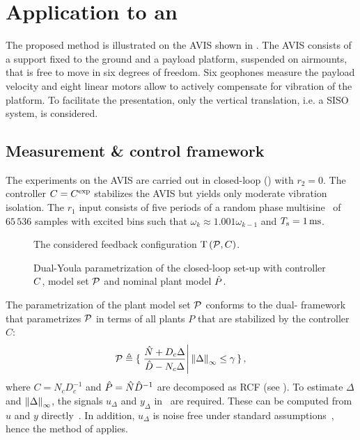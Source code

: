 \section{Application to an }
\label{sec:measurement}
The proposed method is illustrated on the \gls{AVIS} shown in .
The \gls{AVIS} consists of a support fixed to the ground and a payload platform, suspended on airmounts, that is free to move in six degrees of freedom.
Six geophones measure the payload velocity and eight linear motors allow to actively compensate for vibration of the platform.
To facilitate the presentation, only the vertical translation, i.e. a \gls{SISO} system,  is considered.

\subsection{Measurement \& control framework}
\label{sec:control}
The experiments on the \gls{AVIS} are carried out in closed-loop () with $r_2 = 0$.
The controller $\Controller=\experimental\Controller$  stabilizes the \gls{AVIS} but yields only moderate vibration isolation.
The $r_1$ input consists of five periods of a random phase multisine~\citep{Geerardyn2013TIM} of $65\,536$ samples with excited bins such that $\omega_k \approx 1.001 \omega_{k-1}$  and $\Ts=1\unit{ms}$.

\begin{figure}
 \centering
 
 \caption{The considered feedback configuration $\ClosedLoop{\ModelSet[],\Controller}$.}
 \label{fig:tpc}
\end{figure}

\begin{figure}
 \centering
 
 \caption{Dual-Youla parametrization of the closed-loop set-up  with controller $\Controller$,  model set $\ModelSet[]$ and nominal plant model $\estimated\Plant$.}
\label{fig:dualYoula}
\end{figure}

The parametrization of the plant model set $\ModelSet[]$ conforms to the dual-\YK{} framework~\citep{Hansen1989,Anderson1998} that parametrizes $\ModelSet[]$ in terms of  all plants $P$ that are stabilized by the controller $C$:
\begin{equation}
  \ModelSet[] 
    \isdef 
      \set{
          \left. 
            \frac{\hat{N} + D_c \Delta}
                 {\hat{D} - N_c \Delta} 
          \right| 
            \hinfnorm{\Delta} \leq \gamma
        }
  \label{eq:dualYoulaModelSet}
  \text{,}
\end{equation}
where $C=N_c D_c^{-1}$ and $\estimated\Plant = \estimated{N}\estimated{D}^{-1}$ are decomposed as \gls{RCF} (see ).
To estimate $\Delta$ and $\hinfnorm{\Delta}$, the signals $u_{\Delta}$ and $y_{\Delta}$ in~ are required.
These can be computed from $u$ and $y$ directly~\citep{Anderson1998}.
In addition, $u_{\Delta}$ is noise free under standard assumptions~\citep{Hansen1989}, hence the method of  applies.

